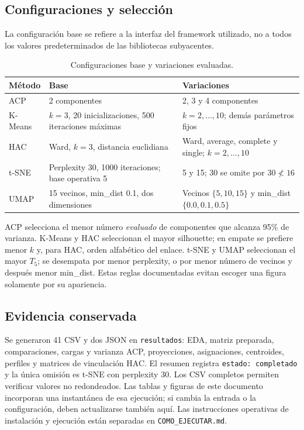 \documentclass[11pt]{article}
\begin{document}
\subsection{Configuraciones y selección}
La configuración base se refiere a la interfaz del framework utilizado,
no a todos los valores predeterminados de las bibliotecas subyacentes.
\begin{table}[htbp]\centering\small
\caption{Configuraciones base y variaciones evaluadas.}
\begin{tabular}{lp{5cm}p{6cm}}\toprule
Método & Base & Variaciones \\ \midrule
ACP & 2 componentes & 2, 3 y 4 componentes \\
K-Means & $k=3$, 20 inicializaciones, 500 iteraciones máximas &
$k=2,\ldots,10$; demás parámetros fijos \\
HAC & Ward, $k=3$, distancia euclidiana &
Ward, average, complete y single; $k=2,\ldots,10$ \\
t-SNE & Perplexity 30, 1000 iteraciones; base operativa 5 &
5 y 15; 30 se omite por $30\not<16$ \\
UMAP & 15 vecinos, min\_dist 0.1, dos dimensiones &
Vecinos $\{5,10,15\}$ y min\_dist $\{0.0,0.1,0.5\}$ \\
\bottomrule\end{tabular}\end{table}

ACP selecciona el menor número \emph{evaluado} de componentes que alcanza
95\% de varianza. K-Means y HAC seleccionan el mayor silhouette; en empate
se prefiere menor $k$ y, para HAC, orden alfabético del enlace.
t-SNE y UMAP seleccionan el mayor $T_5$; se desempata por menor perplexity,
o por menor número de vecinos y después menor min\_dist. Estas reglas
documentadas evitan escoger una figura solamente por su apariencia.

\subsection{Evidencia conservada}
Se generaron 41 CSV y dos JSON en \texttt{resultados}: EDA, matriz preparada,
comparaciones, cargas y varianza ACP, proyecciones, asignaciones, centroides,
perfiles y matrices de vinculación HAC. El resumen registra
\texttt{estado: completado} y la única omisión es t-SNE con perplexity 30.
Los CSV completos permiten verificar valores no redondeados. Las tablas y
figuras de este documento incorporan una instantánea de esa ejecución;
si cambia la entrada o la configuración, deben actualizarse también aquí.
Las instrucciones operativas de instalación y ejecución están separadas
en \texttt{COMO\_EJECUTAR.md}.
\FloatBarrier
\clearpage
\end{document}
